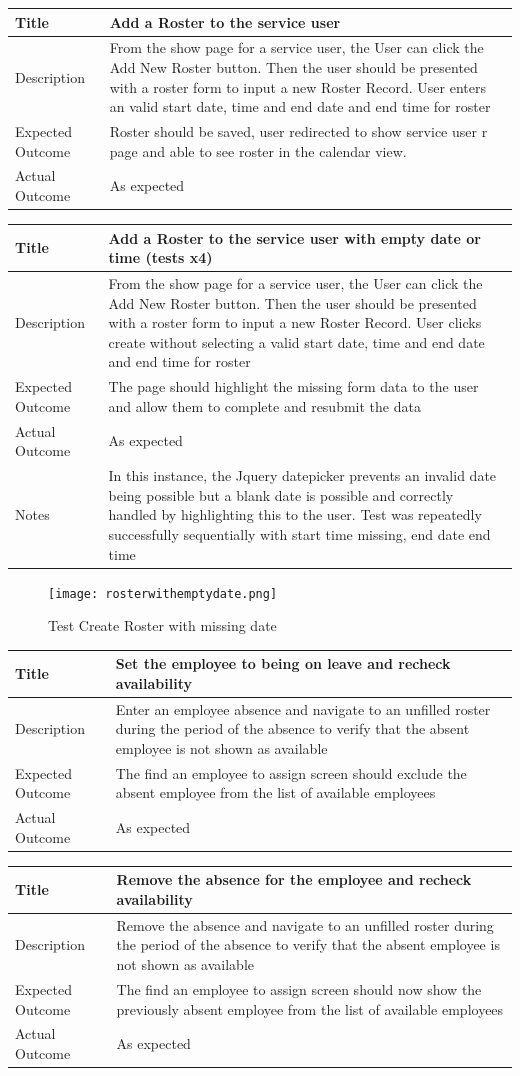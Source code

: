 \documentclass[a4paper,Times New Roman 11pt]{article}
\newcommand\addrow[2]{#1 &#2\\ }
\newcommand\addheading[2]{#1 &#2\\ \hline}
\newcommand\tabularhead{\begin{tabular}{lp{9cm}}
\hline
}
\newenvironment{usecase}{\tabularhead}
{\hline\end{tabular}}
\begin{document}
\begin{usecase}
    \addheading{Title}{Add a Roster to the service user}
  \addheading{Description}{From the show page for a service user, the User  can click the Add New Roster button. Then the user should be presented with a roster form to input a new Roster Record. User enters an valid start date, time and end date and end time for roster}
  \addrow{Expected Outcome}{Roster should be saved, user redirected to show service user r page and able to see roster in the calendar view.}
  \addrow{Actual Outcome}{As expected}
\end{usecase}

\begin{usecase}
    \addheading{Title}{Add a Roster to the service user with empty date or time (tests x4)}
  \addheading{Description}{From the show page for a service user, the User  can click the Add New Roster button. Then the user should be presented with a roster form to input a new Roster Record. User clicks create without selecting a valid start date, time and end date and end time for roster}
  \addrow{Expected Outcome}{The page should highlight the missing form data to the user and allow them to complete and resubmit the data}
  \addrow{Actual Outcome}{As expected}
  \addrow{Notes}{In this instance, the Jquery datepicker prevents an invalid date being possible but a blank date is possible and correctly handled by highlighting this to the user. Test was repeatedly successfully sequentially with start time missing, end date end time}
\end{usecase}

 \begin{figure}[h!]
\texttt{[image: rosterwithemptydate.png]}
  \caption{Test Create Roster with missing date }
  \label{fig:Test Create Roster with missing date }
\end{figure}

\begin{usecase}
    \addheading{Title}{Set the employee to being on leave and recheck availability}
  \addheading{Description}{Enter an employee absence and navigate to an unfilled roster during the period of the absence to verify that the absent employee is not shown as available}
  \addrow{Expected Outcome}{The find an employee to assign screen should exclude the absent employee from the list of available employees}
  \addrow{Actual Outcome}{As expected}
\end{usecase}

\begin{usecase}
    \addheading{Title}{Remove the absence for the employee and recheck availability}
  \addheading{Description}{Remove the absence and navigate to an unfilled roster during the period of the absence to verify that the absent employee is not shown as available}
  \addrow{Expected Outcome}{The find an employee to assign screen should now show the previously absent employee from the list of available employees}
  \addrow{Actual Outcome}{As expected}
\end{usecase}
\end{document}
